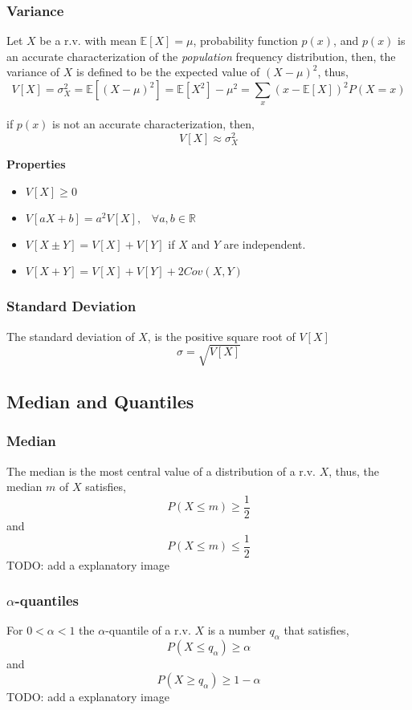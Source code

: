 \subsubsection{Variance}
Let $X$ be a r.v. with mean $\mathbb{E}[X] = \mu$, probability function $p(x)$, and $p(x)$ is an accurate characterization of the \textit{population} 
frequency distribution, then, the variance of $X$ is defined to be the expected value of $(X-\mu)^2$, thus,
\[ V[X] = \sigma^2_X = \mathbb{E}[(X-\mu)^2] = \mathbb{E}[X^2] - \mu^2 = \sum_{x}(x-\mathbb{E}[X])^2 P(X=x) \]

if $p(x)$ is not an accurate characterization, then,
\[ V[X] \approx \sigma^2_{X} \]

\textbf{Properties}
\begin{itemize}
    \item $V[X] \geq 0$
    \item $V[aX + b] = a^2V[X], \;\;\; \forall a,b \in \mathbb{R}$
    \item $V[X \pm Y] = V[X] + V[Y]$ if $X$ and $Y$ are independent.
    \item $V[X + Y] = V[X] + V[Y] + 2Cov(X,Y)$
\end{itemize}

\subsubsection{Standard Deviation}
The standard deviation of $X$, is the positive square root of $V[X]$
\[ \sigma = \sqrt{V[X]} \]


\subsection{Median and Quantiles}
\subsubsection{Median}
The median is the most central value of a distribution of a r.v. $X$, thus, the median $m$ of $X$ satisfies,
\[ P(X \leq m) \geq \frac{1}{2} \]
and
\[ P(X \leq m) \leq \frac{1}{2} \]
TODO: add a explanatory image

\subsubsection{$\alpha$-quantiles}
For $0 < \alpha < 1$ the $\alpha$-quantile of a r.v. $X$ is a number $q_\alpha$ that satisfies,
\[ P(X \leq q_\alpha) \geq \alpha \] 
and
\[ P(X \geq q_\alpha) \geq 1- \alpha \]
TODO: add a explanatory image

